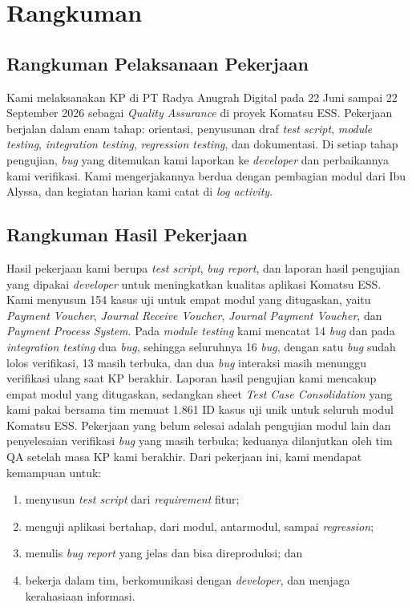 \chapter{Rangkuman}

\section{Rangkuman Pelaksanaan Pekerjaan}
Kami melaksanakan KP di PT Radya Anugrah Digital pada 22 Juni sampai 22 September 2026 sebagai \textit{Quality Assurance} di proyek Komatsu ESS. Pekerjaan berjalan dalam enam tahap: orientasi, penyusunan draf \textit{test script}, \textit{module testing}, \textit{integration testing}, \textit{regression testing}, dan dokumentasi. Di setiap tahap pengujian, \textit{bug} yang ditemukan kami laporkan ke \textit{developer} dan perbaikannya kami verifikasi. Kami mengerjakannya berdua dengan pembagian modul dari Ibu Alyssa, dan kegiatan harian kami catat di \textit{log activity}.

\section{Rangkuman Hasil Pekerjaan}
Hasil pekerjaan kami berupa \textit{test script}, \textit{bug report}, dan laporan hasil pengujian yang dipakai \textit{developer} untuk meningkatkan kualitas aplikasi Komatsu ESS. Kami menyusun 154 kasus uji untuk empat modul yang ditugaskan, yaitu \textit{Payment Voucher}, \textit{Journal Receive Voucher}, \textit{Journal Payment Voucher}, dan \textit{Payment Process System}. Pada \textit{module testing} kami mencatat 14 \textit{bug} dan pada \textit{integration testing} dua \textit{bug}, sehingga seluruhnya 16 \textit{bug}, dengan satu \textit{bug} sudah lolos verifikasi, 13 masih terbuka, dan dua \textit{bug} interaksi masih menunggu verifikasi ulang saat KP berakhir. Laporan hasil pengujian kami mencakup empat modul yang ditugaskan, sedangkan sheet \textit{Test Case Consolidation} yang kami pakai bersama tim memuat 1.861 ID kasus uji unik untuk seluruh modul Komatsu ESS. Pekerjaan yang belum selesai adalah pengujian modul lain dan penyelesaian verifikasi \textit{bug} yang masih terbuka; keduanya dilanjutkan oleh tim QA setelah masa KP kami berakhir. Dari pekerjaan ini, kami mendapat kemampuan untuk:
\begin{enumerate}[label=\arabic*)]
\item menyusun \textit{test script} dari \textit{requirement} fitur;
\item menguji aplikasi bertahap, dari modul, antarmodul, sampai \textit{regression};
\item menulis \textit{bug report} yang jelas dan bisa direproduksi; dan
\item bekerja dalam tim, berkomunikasi dengan \textit{developer}, dan menjaga kerahasiaan informasi.
\end{enumerate}

